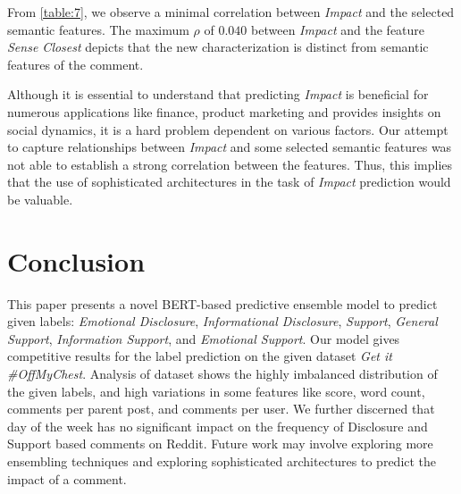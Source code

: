 \documentclass[runningheads]{llncs}
\begin{document}
\begin{table}[]
\centering
{}
\caption{The relationship between Semantic Features and Impact, as represented by Pearson correlation coefficient, $\rho$.}
\label{table:7}
\end{table}

From \autoref{table:7}, we observe a minimal correlation between \textit{Impact} and the selected semantic features. The maximum $\rho$ of $0.040$ between \textit{Impact} and the feature \textit{Sense Closest}\cite{HumorRecognitionPaper} depicts that the new characterization is distinct from semantic features of the comment. 

Although it is essential to understand that predicting \textit{Impact} is beneficial for numerous applications like finance, product marketing and provides insights on social dynamics, it is a hard problem dependent on various factors. Our attempt to capture relationships between \textit{Impact} and some selected semantic features was not able to establish a strong correlation between the features. Thus, this implies that the use of sophisticated architectures in the task of \textit{Impact} prediction would be valuable. 

\section{Conclusion}
This paper presents a novel BERT-based predictive ensemble model to predict given labels: \textit{Emotional Disclosure}, \textit{Informational Disclosure}, \textit{Support}, \textit{General Support}, \textit{Information Support}, and \textit{Emotional Support}. Our model gives competitive results for the label prediction on the given dataset \textit{Get it \#OffMyChest}. Analysis of dataset shows the highly imbalanced distribution of the given labels, and high variations in some features like score, word count, comments per parent post, and comments per user. We further discerned that day of the week has no significant impact on the frequency of Disclosure and Support based comments on Reddit. Future work may involve exploring more ensembling techniques and exploring sophisticated architectures to predict the impact of a comment.



\end{document}
